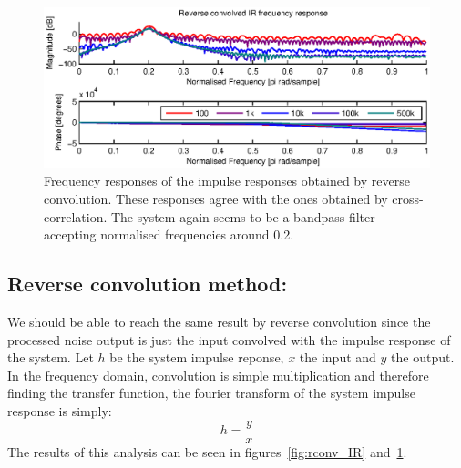 \begin{figure}
	\center
	\includegraphics{./picture/rconv_responses.eps}
	\caption{Frequency responses of the impulse responses obtained by reverse convolution. These responses agree with the ones obtained
	by cross-correlation. The system again seems to be a bandpass filter accepting normalised frequencies around 0.2.}
	\label{fig:rconv_freqz}
\end{figure}

\subsection{Reverse convolution method:}
We should be able to reach the same result by reverse convolution since the processed noise output is just the input convolved with
the impulse response of the system. Let \(h\) be the system impulse reponse, \(x\) the input and \(y\) the output. In the 
frequency domain, convolution is simple multiplication and therefore finding the transfer function, the fourier transform of the system impulse
response is simply:
\begin{equation*}
	h=\frac{y}{x}
\end{equation*}
The results of this analysis can be seen in figures~\ref{fig:rconv_IR} and~\ref{fig:rconv_freqz}.
